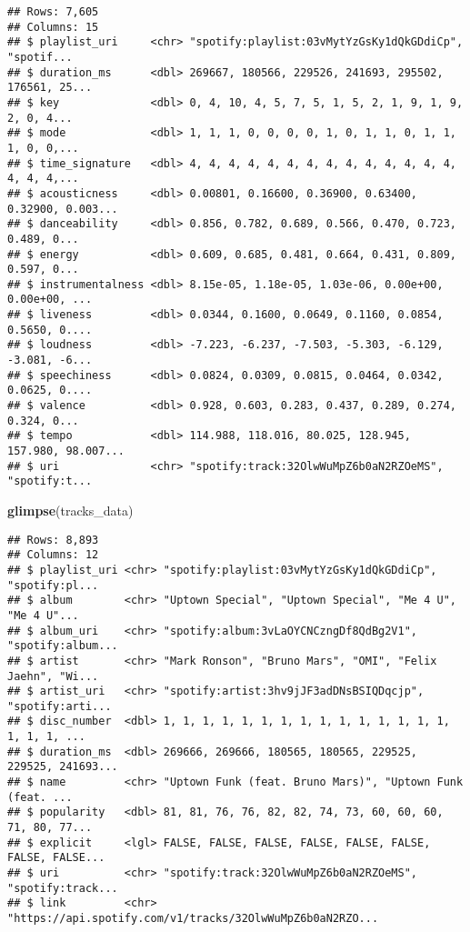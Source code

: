 \documentclass[
]{article}
\newenvironment{Shaded}{\begin{snugshade}}{\end{snugshade}}
\newcommand{\KeywordTok}[1]{\textcolor[rgb]{0.13,0.29,0.53}{\textbf{#1}}}
\newcommand{\NormalTok}[1]{#1}
\begin{document}
\begin{verbatim}
## Rows: 7,605
## Columns: 15
## $ playlist_uri     <chr> "spotify:playlist:03vMytYzGsKy1dQkGDdiCp", "spotif...
## $ duration_ms      <dbl> 269667, 180566, 229526, 241693, 295502, 176561, 25...
## $ key              <dbl> 0, 4, 10, 4, 5, 7, 5, 1, 5, 2, 1, 9, 1, 9, 2, 0, 4...
## $ mode             <dbl> 1, 1, 1, 0, 0, 0, 0, 1, 0, 1, 1, 0, 1, 1, 1, 0, 0,...
## $ time_signature   <dbl> 4, 4, 4, 4, 4, 4, 4, 4, 4, 4, 4, 4, 4, 4, 4, 4, 4,...
## $ acousticness     <dbl> 0.00801, 0.16600, 0.36900, 0.63400, 0.32900, 0.003...
## $ danceability     <dbl> 0.856, 0.782, 0.689, 0.566, 0.470, 0.723, 0.489, 0...
## $ energy           <dbl> 0.609, 0.685, 0.481, 0.664, 0.431, 0.809, 0.597, 0...
## $ instrumentalness <dbl> 8.15e-05, 1.18e-05, 1.03e-06, 0.00e+00, 0.00e+00, ...
## $ liveness         <dbl> 0.0344, 0.1600, 0.0649, 0.1160, 0.0854, 0.5650, 0....
## $ loudness         <dbl> -7.223, -6.237, -7.503, -5.303, -6.129, -3.081, -6...
## $ speechiness      <dbl> 0.0824, 0.0309, 0.0815, 0.0464, 0.0342, 0.0625, 0....
## $ valence          <dbl> 0.928, 0.603, 0.283, 0.437, 0.289, 0.274, 0.324, 0...
## $ tempo            <dbl> 114.988, 118.016, 80.025, 128.945, 157.980, 98.007...
## $ uri              <chr> "spotify:track:32OlwWuMpZ6b0aN2RZOeMS", "spotify:t...
\end{verbatim}

\begin{Shaded}
\begin{Highlighting}[]
\KeywordTok{glimpse}\NormalTok{(tracks_data)}
\end{Highlighting}
\end{Shaded}

\begin{verbatim}
## Rows: 8,893
## Columns: 12
## $ playlist_uri <chr> "spotify:playlist:03vMytYzGsKy1dQkGDdiCp", "spotify:pl...
## $ album        <chr> "Uptown Special", "Uptown Special", "Me 4 U", "Me 4 U"...
## $ album_uri    <chr> "spotify:album:3vLaOYCNCzngDf8QdBg2V1", "spotify:album...
## $ artist       <chr> "Mark Ronson", "Bruno Mars", "OMI", "Felix Jaehn", "Wi...
## $ artist_uri   <chr> "spotify:artist:3hv9jJF3adDNsBSIQDqcjp", "spotify:arti...
## $ disc_number  <dbl> 1, 1, 1, 1, 1, 1, 1, 1, 1, 1, 1, 1, 1, 1, 1, 1, 1, 1, ...
## $ duration_ms  <dbl> 269666, 269666, 180565, 180565, 229525, 229525, 241693...
## $ name         <chr> "Uptown Funk (feat. Bruno Mars)", "Uptown Funk (feat. ...
## $ popularity   <dbl> 81, 81, 76, 76, 82, 82, 74, 73, 60, 60, 60, 71, 80, 77...
## $ explicit     <lgl> FALSE, FALSE, FALSE, FALSE, FALSE, FALSE, FALSE, FALSE...
## $ uri          <chr> "spotify:track:32OlwWuMpZ6b0aN2RZOeMS", "spotify:track...
## $ link         <chr> "https://api.spotify.com/v1/tracks/32OlwWuMpZ6b0aN2RZO...
\end{verbatim}
\end{document}
